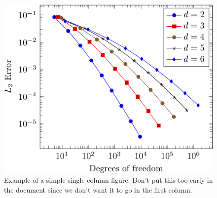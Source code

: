 \documentclass[11pt,proc,twoside]{RMxAC_rho-class/RMxAC_rho}
\begin{document}
\begin{figure}[!t]
\centering
  \includegraphics[width=0.95\columnwidth]{figures/example2.pdf}
  \caption{Example of a simple single-column figure. Don't put this
    too early in the document since we don't want it to go in the
    first column.}
  \label{fig:simple}
\end{figure}







\end{document}
